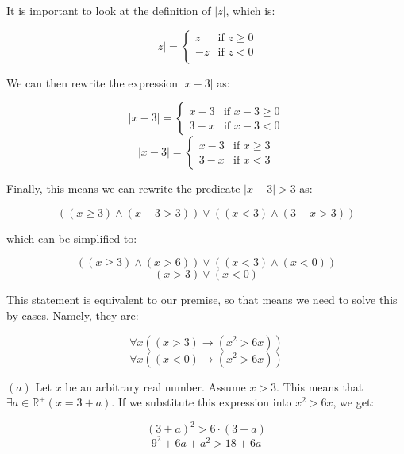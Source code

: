 \documentclass{article}
\newcommand{\subproblem}[1]{$\boxed{(#1)}$}
\begin{document}
\begin{multicols*}{2}
It is important to look at the definition of $|z|$, which is:

\[
|z|=\begin{cases}z & \text{if $z\ge{}0$} \\
-z & \text{if $z<0$} \\
\end{cases}
\]

We can then rewrite the expression $|x-3|$ as:

\[
|x-3|=\begin{cases}x-3 & \text{if $x-3\ge 0$} \\
3-x & \text{if $x-3<0$}
\end{cases}
\] \[
|x-3|=\begin{cases}x-3 & \text{if $x\ge 3$} \\
3-x & \text{if $x<3$}
\end{cases}
\]

Finally, this means we can rewrite the predicate $|x-3|>3$ as:

\[
((x\ge 3)\wedge(x-3>3))\vee((x<3)\wedge(3-x>3))
\]

which can be simplified to:

\[
((x\ge 3)\wedge(x>6))\vee((x<3)\wedge(x<0))
\] \[
(x>3)\vee(x<0)
\]

This statement is equivalent to our premise, so that means we need to
solve this by cases. Namely, they are:

\[\tag{a}
\forall x((x>3)\rightarrow(x^2>6x))
\] \[\tag{b}
\forall x((x<0)\rightarrow(x^2>6x))
\]

\subproblem{a} Let $x$ be an arbitrary real number. Assume $x>3$. This
means that $\exists{}a\in\mathbb{R}^+(x=3+a)$. If we substitute this
expression into $x^2>6x$, we get:

\[
(3+a)^2>6\cdot(3+a)
\] \[
9^2+6a+a^2>18+6a
\]

\end{multicols*}
\end{document}
